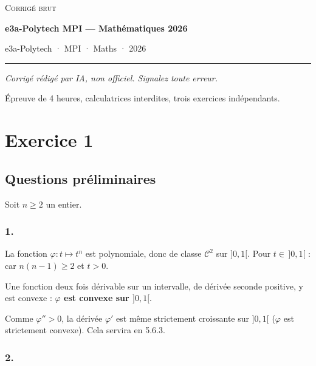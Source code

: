\documentclass[11pt,a4paper]{article}
\newcommand{\equationajustee}[1]{%
  \sbox{\boiteequation}{$\displaystyle #1$}%
  \ifdim\wd\boiteequation>\linewidth
    \[\resizebox{\linewidth}{!}{\usebox{\boiteequation}}\]%
  \else
    \[#1\]%
  \fi}
\begin{document}
\thispagestyle{plain}
\begin{center}
  {\small\scshape Corrigé brut}\par\smallskip
  {\LARGE\bfseries e3a-Polytech MPI — Mathématiques 2026\par}\medskip
  {\large e3a-Polytech · MPI · Maths · 2026\par}
\end{center}
\vspace{2pt}\hrule\vspace{8pt}

\emph{Corrigé rédigé par IA, non officiel. Signalez toute erreur.}

Épreuve de 4 heures, calculatrices interdites, trois exercices indépendants.

\hypertarget{exercice-1}{%
\section{Exercice 1}\label{exercice-1}}

\hypertarget{questions-pruxe9liminaires}{%
\subsection{Questions préliminaires}\label{questions-pruxe9liminaires}}

Soit \(n\ge 2\) un entier.

\hypertarget{section}{%
\subsubsection{1.}\label{section}}

La fonction \(\varphi:t\mapsto t^n\) est polynomiale, donc de classe \(\mathcal C^2\) sur \(]0,1[\). Pour \(t\in\,]0,1[\) :
\equationajustee{\varphi''(t)=n(n-1)\,t^{n-2}>0,}
car \(n(n-1)\ge 2\) et \(t>0\).

Une fonction deux fois dérivable sur un intervalle, de dérivée seconde positive, y est convexe : \textbf{\(\varphi\) est convexe sur \(]0,1[\)}.

Comme \(\varphi''>0\), la dérivée \(\varphi'\) est même strictement croissante sur \(]0,1[\) (\(\varphi\) est strictement convexe). Cela servira en 5.6.3.

\hypertarget{section-1}{%
\subsubsection{2.}\label{section-1}}
\end{document}
